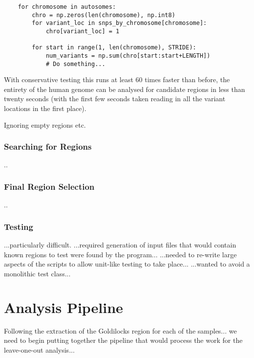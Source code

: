 \begin{verbatim}
    for chromosome in autosomes:
        chro = np.zeros(len(chromosome), np.int8)
        for variant_loc in snps_by_chromosome[chromosome]:
            chro[variant_loc] = 1

        for start in range(1, len(chromosome), STRIDE):
            num_variants = np.sum(chro[start:start+LENGTH])
            # Do something...
\end{verbatim}

With conservative testing this runs at least 60 times faster than before, the
entirety of the human genome can be analysed for candidate regions in less than
twenty seconds (with the first few seconds taken reading in all the variant
locations in the first place).

Ignoring empty regions etc.


\subsection{Searching for Regions}

..


\subsection{Final Region Selection}

..


\subsection{Testing}
...particularly difficult.
...required generation of input files that would contain known regions to test
were found by the program...
...needed to re-write large aspects of the scripts to allow unit-like testing to
take place... ...wanted to avoid a monolithic test class...



\chapter{Analysis Pipeline}

Following the extraction of the Goldilocks region for each of the samples... we
need to begin putting together the pipeline that would process the work for the
leave-one-out analysis...

